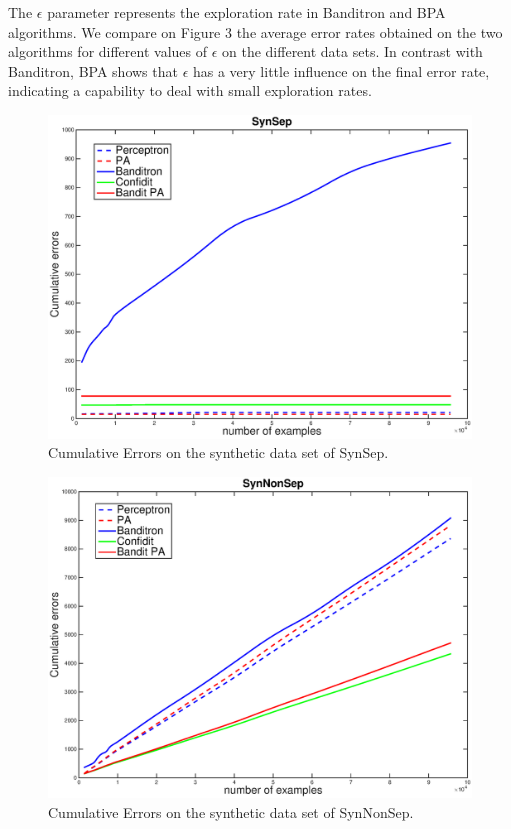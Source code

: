 \documentclass[twocolumn]{article}
\begin{document}
The $\epsilon$ parameter represents the exploration rate in Banditron and BPA algorithms. We compare on Figure 3 the average error rates obtained on the two algorithms for different values of $\epsilon$ on the different data sets. In contrast with Banditron, BPA shows that $\epsilon$ has a very little influence on the final error rate, indicating a capability to deal with small exploration rates.


\begin{figure}[h!]
	
	\centerline{
		\includegraphics[width=\linewidth]{figs/SynSep.eps}
	}
	\caption{Cumulative Errors on the synthetic data set of  SynSep.}
	\label{pic:BPASS}
\end{figure}
\begin{figure}[h!]
	
	\centerline{
		\includegraphics[width=\linewidth]{figs/SynNonSep.eps}
	}
	\caption{Cumulative Errors on the synthetic data set of SynNonSep.}
	\label{pic:BPASNS}
\end{figure}
\end{document}
